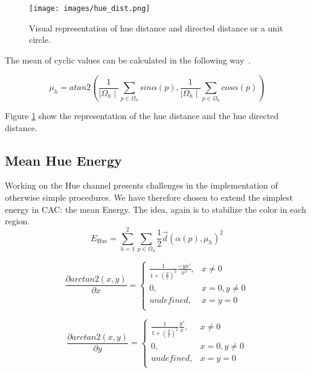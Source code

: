 \begin{figure}[h]
	\centering
	{\texttt{[image: images/hue\_dist.png]}}
	\caption{Visual representation of hue distance and directed distance or a unit circle.}
	\label{fig:hue_dist}
\end{figure}

The mean of cyclic values can be calculated in the following way~\cite{Zhang00anew}.

\begin{equation}
\mu_h = atan2\left(\frac{1}{\mid \Omega_h\mid}\sum_{p\in \Omega_h} sin\alpha(p),\frac{1}{\mid \Omega_h\mid}\sum_{p\in \Omega_h} cos\alpha(p)\right)
\end{equation} 

Figure \ref{fig:hue_dist} show the representation of the hue distance and the hue directed distance.

\subsection{Mean Hue Energy}

Working on the Hue channel presents challenges in the implementation of otherwise simple procedures. We have therefore chosen to extend the simplest energy in CAC: the mean Energy. The idea, again is to stabilize the color in each region. \\

\begin{equation}
E_{\mathrm{Hue}} = \sum\limits_{h=1}^2\sum_{p\in \Omega_h} \frac{1	}{2}\vec{d}(\alpha(p),\mu_h)^2
\end{equation}

\begin{equation}\label{eq:arctan2x} 
\frac{\partial arctan2(x,y)}{\partial x} =
\begin{cases}
\frac{1}{1+(\frac{y}{x})^2}\frac{-yx'}{x^2},  & x\neq 0 \\
0,  & x=0, y\neq 0 \\
undefined, & x=y=0\\
\end{cases}
\end{equation}

\begin{equation}\label{eq:arctan2y}
\frac{\partial arctan2(x,y)}{\partial y} =
\begin{cases}
\frac{1}{1+(\frac{y}{x})^2}\frac{y'}{x},  & x\neq 0 \\
0,  & x=0, y\neq 0 \\
undefined, & x=y=0\\
\end{cases}
\end{equation}
 
